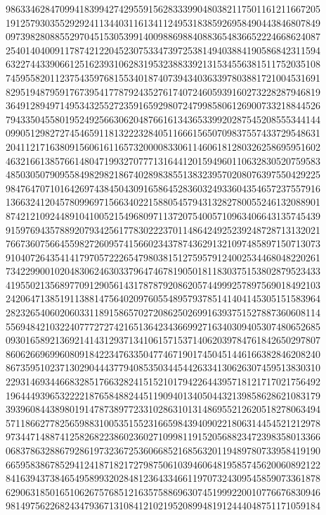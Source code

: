 {{    9863346284709941839942742955915628333990480382117501161211667205 ~
    1912579303552929241134403116134112495318385926958490443846807849 ~
    0973982808855297045153053991400988698840883654836652224668624087 ~
    2540140400911787421220452307533473972538149403884190586842311594 ~
    6322744339066125162393106283195323883392131534556381511752035108 ~
    7459558201123754359768155340187407394340363397803881721004531691 ~
    8295194879591767395417787924352761740724605939160273228287946819 ~
    3649128949714953432552723591659298072479985806126900733218844526 ~
    7943350455801952492566306204876616134365339920287545208555344144 ~
    0990512982727454659118132223284051166615650709837557433729548631 ~
    2041121716380915606161165732000083306114606181280326258695951602 ~
    4632166138576614804719932707771316441201594960110632830520759583 ~
    4850305079095584982982186740289838551383239570208076397550429225 ~
    9847647071016426974384504309165864528360324933604354657237557916 ~
    1366324120457809969715663402215880545794313282780055246132088901 ~
    8742121092448910410052154968097113720754005710963406643135745439 ~
    9159769435788920793425617783022237011486424925239248728713132021 ~
    7667360756645598272609574156602343787436291321097485897150713073 ~
    9104072643541417970572226547980381512759579124002534468048220261 ~
    7342299001020483062463033796474678190501811830375153802879523433 ~
    4195502135689770912905614317878792086205744999257897569018492103 ~
    2420647138519113881475640209760554895793785141404145305151583964 ~
    2823265406020603311891586570272086250269916393751527887360608114 ~
    5569484210322407772727421651364234366992716340309405307480652685 ~
    0930165892136921414312937134106157153714062039784761842650297807 ~
    8606266969960809184223476335047746719017450451446166382846208240 ~
    8673595102371302904443779408535034454426334130626307459513830310 ~
    2293146934466832851766328241515210179422644395718121717021756492 ~
    1964449396532222187658488244511909401340504432139858628621083179 ~
    3939608443898019147873897723310286310131486955212620518278063494 ~
    5711866277825659883100535155231665984394090221806314454521212978 ~
    9734471488741258268223860236027109981191520568823472398358013366 ~
    0683786328867928619732367253606685216856320119489780733958419190 ~
    6659583867852941241871821727987506103946064819585745620060892122 ~
    8416394373846549589932028481236433466119707324309545859073361878 ~
    6290631850165106267576851216357588696307451999220010776676830946 ~
    9814975622682434793671310841210219520899481912444048751171059184 ~
}}
